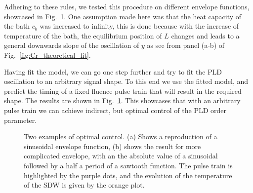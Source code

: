 Adhering to these rules, we tested this procedure on different envelope functions, showcased in Fig.~\ref{fig:Cr_control}.
One assumption made here was that the heat capacity of the bath $c_b$ was increased to infinity, this is done because with the increase of temperature of the bath, the equilibrium position of $L$ changes and leads to a general downwards slope of the oscillation of $y$ as see from panel (a-b) of Fig.~\ref{fig:Cr_theoretical_fit}.

Having fit the model, we can go one step further and try to fit the PLD oscillation to an arbitrary signal shape. To this end we use the fitted model, and predict the timing of a fixed fluence pulse train that will result in the required shape. The results are shown in Fig.~\ref{fig:Cr_control}. This showcases that with an arbitrary pulse train we can achieve indirect, but optimal control of the PLD order parameter.
\begin{figure}
	\caption{\label{fig:Cr_control} Two examples of optimal control. (a) Shows a reproduction of a sinusoidal envelope function, (b) shows the result for more complicated envelope, with an the absolute value of a sinusoidal followed by a half a period of a sawtooth function. The pulse train is highlighted by the purple dots, and the evolution of the temperature of the SDW is given by the orange plot.}
\end{figure}



